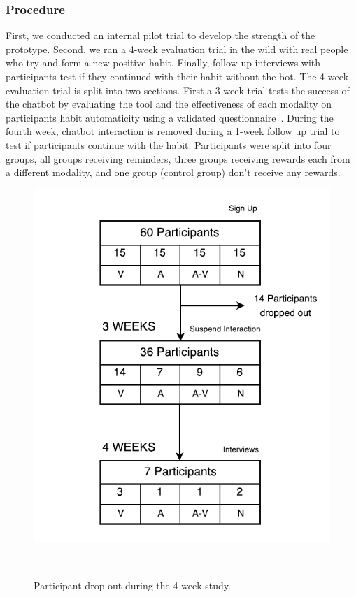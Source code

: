 \documentclass{scaffold/sigchi}
\begin{document}
\subsubsection{Procedure}
First, we conducted an internal pilot trial to develop the strength of the prototype. Second, we ran a 4-week evaluation trial in the wild with real people who try and form a new positive habit. Finally, follow-up interviews with participants test if they continued with their habit without the bot.\newline
\newline
The 4-week evaluation trial is split into two sections. First a 3-week trial tests the success of the chatbot by evaluating the tool and the effectiveness of each modality on participants habit automaticity using a validated questionnaire~\cite{article_4q_SRBAI}. During the fourth week, chatbot interaction is removed during a 1-week follow up trial to test if participants continue with the habit. Participants were split into four groups, all groups receiving reminders, three groups receiving rewards each from a different modality, and one group (control group) don't receive any rewards.

\begin{figure}
  \centering
  \includegraphics[width=.8\columnwidth]{figures/study-flow}
  \caption{Participant drop-out during the 4-week study.}~\label{fig:study_dropout}
\end{figure}
\end{document}
